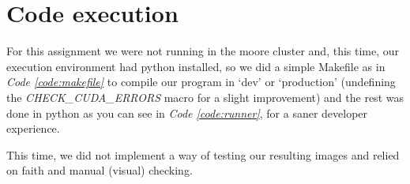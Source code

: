 \documentclass[../main.tex]{subfiles}
\begin{document}
\section{Code execution}

For this assignment we were not running in the moore cluster and, this time, our execution environment had python installed, so we did a simple Makefile as in \textit{Code \ref{code:makefile}} to compile our program in `dev' or `production' (undefining the \textit{CHECK\_CUDA\_ERRORS} macro for a slight improvement) and the rest was done in python as you can see in \textit{Code \ref{code:runner}}, for a saner developer experience.

This time, we did not implement a way of testing our resulting images and relied on faith and manual (visual) checking.
\end{document}
